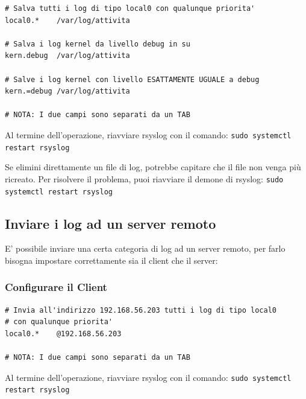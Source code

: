 \documentclass[a4paper]{report}
\newenvironment{ricordati}{\begin{tcolorbox}[fonttitle=\sffamily\bfseries\large,title=Ricordati,colframe=orange!75!white]}{\end{tcolorbox}}
\newenvironment{code}{\begin{tcolorbox}[size=small]}{\end{tcolorbox}}
\begin{document}
\begin{code}
\begin{lstlisting}
# Salva tutti i log di tipo local0 con qualunque priorita'
local0.*	/var/log/attivita

# Salva i log kernel da livello debug in su
kern.debug	/var/log/attivita

# Salve i log kernel con livello ESATTAMENTE UGUALE a debug
kern.=debug	/var/log/attivita

# NOTA: I due campi sono separati da un TAB
\end{lstlisting}
\end{code}

\begin{ricordati}
	Al termine dell'operazione, riavviare rsyslog con il comando: \texttt{sudo systemctl restart rsyslog}
\end{ricordati}

\begin{ricordati}
	Se elimini direttamente un file di log, potrebbe capitare che il file non venga più ricreato. Per risolvere il problema, puoi riavviare il demone di rsyslog: \texttt{sudo systemctl restart rsyslog}
\end{ricordati}

\subsection{Inviare i log ad un server remoto}

E' possibile inviare una certa categoria di log ad un server remoto, per farlo bisogna impostare correttamente sia il client che il server:

\subsubsection{Configurare il Client}

\begin{code}
\begin{lstlisting}
# Invia all'indirizzo 192.168.56.203 tutti i log di tipo local0 
# con qualunque priorita'
local0.*	@192.168.56.203

# NOTA: I due campi sono separati da un TAB
\end{lstlisting}
\end{code}

\begin{ricordati}
	Al termine dell'operazione, riavviare rsyslog con il comando: \texttt{sudo systemctl restart rsyslog}
\end{ricordati}
\end{document}
